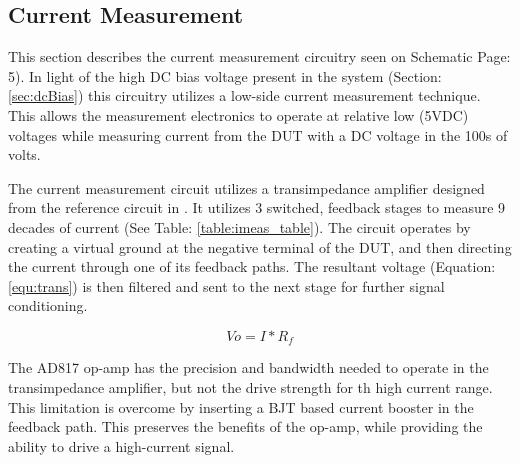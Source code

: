 \subsection{Current Measurement}
\label{sec:iMeas}

This section describes the current measurement circuitry seen on Schematic Page: 5). In light of the high DC bias voltage present in the system (Section: \ref{sec:dcBias}) this circuitry utilizes a low-side current measurement technique. This allows the measurement electronics to operate at relative low (5VDC) voltages while measuring current from the DUT with a DC voltage in the 100s of volts.



The current measurement circuit utilizes a transimpedance amplifier designed from the reference circuit in \cite{steve_thesis}. It utilizes 3 switched, feedback stages to measure 9 decades of current (See Table: \ref{table:imeas_table}). The circuit operates by creating a virtual ground at the negative terminal of the DUT, and then directing the current through one of its feedback paths. The resultant voltage (Equation: \eqref{equ:trans}) is then filtered and sent to the next stage for further signal conditioning.

\begin{equation}
\label{equ:trans}
Vo = I*R_f
\end{equation}

The AD817 op-amp has the precision and bandwidth needed to operate in the transimpedance amplifier, but not the drive strength for th high current range. This limitation is overcome by inserting a BJT based current booster in the feedback path. This preserves the benefits of the op-amp, while providing the ability to drive a high-current signal.

